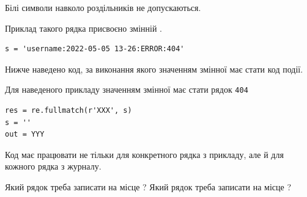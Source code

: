 \documentclass[12pt, ukrainian]{article}
\def\code#1{\Verb!#1!}
\begin{document}
{Білі символи навколо роздільників не допускаються.

Приклад такого рядка присвоєно змінній .



\begin{verbatim}
s = 'username:2022-05-05 13-26:ERROR:404'
\end{verbatim}


Нижче наведено код, за виконання якого значенням змінної  має стати код події.

Для наведеного прикладу значенням змінної  має стати рядок \code{404}



\begin{verbatim}
res = re.fullmatch(r'XXX', s)
s = ''
out = YYY
\end{verbatim}


Код має працювати не тільки для конкретного рядка з прикладу, але й для кожного рядка з журналу.


Який рядок треба записати на місце  ?
Який рядок треба записати на місце  ?\par

}
\newpage
\end{document}
